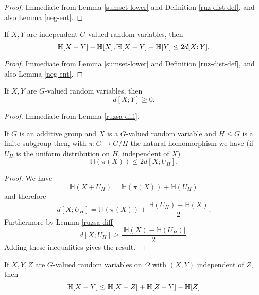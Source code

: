 \begin{proof}  \leanok Immediate from Lemma \ref{sumset-lower} and Definition \ref{ruz-dist-def}, and also Lemma \ref{neg-ent}.
\end{proof}

\begin{lemma}\label{ruzsa-growth}
  \leanok
  If $X,Y$ are independent $G$-valued random variables, then
$$  \mathbb{H}[X-Y] - \mathbb{H}[X], \mathbb{H}[X-Y] - \mathbb{H}[Y] \leq 2d[X ;Y].$$
\end{lemma}

\begin{proof}  \leanok Immediate from Lemma \ref{sumset-lower} and Definition \ref{ruz-dist-def}, and also Lemma \ref{neg-ent}.
\end{proof}

\begin{lemma}\label{ruzsa-nonneg}
  \leanok
  If $X,Y$ are $G$-valued random variables, then
  $$ d[X ;Y] \geq 0.$$
\end{lemma}

\begin{proof}
  \leanok
  Immediate from Lemma \ref{ruzsa-diff}.
\end{proof}


\begin{lemma}\label{dist-projection}
If $G$ is an additive group and $X$ is a $G$-valued random variable and $H\leq G$ is a finite subgroup then, with $\pi:G\to G/H$ the natural homomorphism we have (if $U_H$ is the  uniform distribution on $H$, independent of $X$)
\[\mathbb{H}(\pi(X))\leq 2d[X;U_H].\]
\end{lemma}
\begin{proof}
We have
\[\mathbb{H}(X+U_H)=\mathbb{H}(\pi(X))+\mathbb{H}(U_H)\]
and therefore
\[d[X;U_H]=\mathbb{H}(\pi(X))+\frac{\mathbb{H}(U_H)-\mathbb{H}(X)}{2}.\]
Furthermore by Lemma \ref{ruzsa-diff}
\[d[X;U_H]\geq \frac{\lvert \mathbb{H}(X)-\mathbb{H}(U_H)\rvert}{2}.\]
Adding these inequalities gives the result.
\end{proof}

\begin{lemma}\label{ruzsa-triangle-improved}\leanok  If $X,Y,Z$ are $G$-valued random variables on $\Omega$ with $(X,Y)$ independent of $Z$, then
  \begin{equation}\label{submod-explicit} \mathbb{H}[X - Y] \leq \mathbb{H}[X-Z] + \mathbb{H}[Z-Y] - \mathbb{H}[Z]\end{equation}
\end{lemma}

